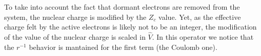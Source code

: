 \documentclass[aip]{revtex4-1}
\begin{document}
To take into account the fact that dormant electrons are removed from the
system, the nuclear charge is modified by the $Z_c$ value.
Yet, as the effective charge felt by the active electrons is likely not to be an integer,
the modification of the value of the nuclear charge is scaled in $\hat{V}$.
In this operator we notice that the \(r^{-1}\) behavior is mantained for the first term 
(the Coulomb one).

\end{document}
